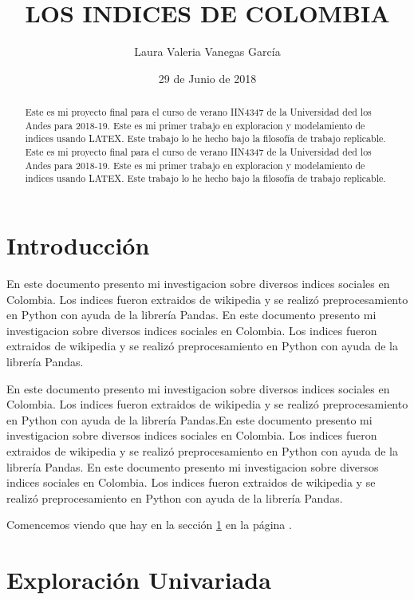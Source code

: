 \documentclass{article}
\title{LOS INDICES DE COLOMBIA}
\author[1]{\normalsize Laura Valeria Vanegas García}
\affil[1]{\small  Facultad de Ingeniería,Universidad de los Andes\\
\texttt{{lv.vanegas10}@uniandes.edu.co}}
\date{29 de Junio de 2018}
\begin{document}


\maketitle

\begin{abstract}
Este es mi proyecto final para el curso de verano IIN4347 de la Universidad ded los Andes para 2018-19. Este es mi primer trabajo en exploracion y modelamiento de indices usando LATEX. Este trabajo lo he hecho bajo la filosofía de trabajo replicable. Este es mi proyecto final para el curso de verano IIN4347 de la Universidad ded los Andes para 2018-19. Este es mi primer trabajo en exploracion y modelamiento de indices usando LATEX. Este trabajo lo he hecho bajo la filosofía de trabajo replicable.
\end{abstract}

\section*{Introducción}

En este documento presento mi investigacion sobre diversos indices sociales en Colombia. Los indices fueron extraidos de wikipedia y se realizó preprocesamiento en Python con ayuda de la librería Pandas. En este documento presento mi investigacion sobre diversos indices sociales en Colombia. Los indices fueron extraidos de wikipedia y se realizó preprocesamiento en Python con ayuda de la librería Pandas. 

En este documento presento mi investigacion sobre diversos indices sociales en Colombia. Los indices fueron extraidos de wikipedia y se realizó preprocesamiento en Python con ayuda de la librería Pandas.En este documento presento mi investigacion sobre diversos indices sociales en Colombia. Los indices fueron extraidos de wikipedia y se realizó preprocesamiento en Python con ayuda de la librería Pandas. En este documento presento mi investigacion sobre diversos indices sociales en Colombia. Los indices fueron extraidos de wikipedia y se realizó preprocesamiento en Python con ayuda de la librería Pandas.

Comencemos viendo que hay en la sección \ref{univariada} en la página \pageref{univariada}.

\clearpage


\section{Exploración Univariada}\label{univariada}
\end{document}
